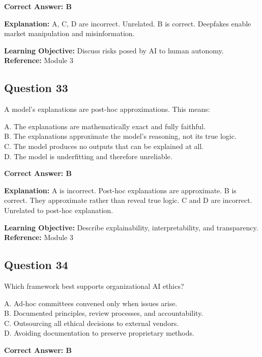\documentclass[11pt]{article}
\begin{document}
	\vspace{0.4em}
	\textbf{Correct Answer: B}
	
	\textbf{Explanation:}
	A, C, D are incorrect. Unrelated.
	B is correct. Deepfakes enable market manipulation and misinformation.
	
	\textbf{Learning Objective:} Discuss risks posed by AI to human autonomy.
	\textbf{Reference:} Module 3
	
	\subsection*{Question 33}
	A model's explanations are post-hoc approximations. This means:
	
	A. The explanations are mathematically exact and fully faithful.\\
	B. The explanations approximate the model's reasoning, not its true logic.\\
	C. The model produces no outputs that can be explained at all.\\
	D. The model is underfitting and therefore unreliable.
	
	\vspace{0.4em}
	\textbf{Correct Answer: B}
	
	\textbf{Explanation:}
	A is incorrect. Post-hoc explanations are approximate.
	B is correct. They approximate rather than reveal true logic.
	C and D are incorrect. Unrelated to post-hoc explanation.
	
	\textbf{Learning Objective:} Describe explainability, interpretability,
	and transparency.
	\textbf{Reference:} Module 3
	
	\subsection*{Question 34}
	Which framework best supports organizational AI ethics?
	
	A. Ad-hoc committees convened only when issues arise.\\
	B. Documented principles, review processes, and accountability.\\
	C. Outsourcing all ethical decisions to external vendors.\\
	D. Avoiding documentation to preserve proprietary methods.
	
	\vspace{0.4em}
	\textbf{Correct Answer: B}
	
\end{document}
